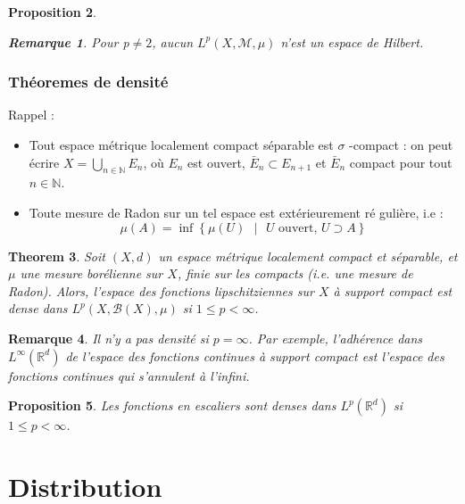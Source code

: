 \documentclass[3pt]{article}
\newtheorem{theorem}{Theorem}
\newtheorem{proposition}[theorem]{Proposition}
\newtheorem{remark}[theorem]{Remarque}
\begin{document}
\bigskip 

\begin{proposition}
\begin{remark}
Pour p$\neq 2$, aucun $L^{p}(X,\mathcal{M},\mu )$ n'est un espace de Hilbert.
\end{remark}
\end{proposition}

\bigskip 

\subsubsection{Th\'{e}oremes de densit\'{e}}

\bigskip 

Rappel : 

\begin{itemize}
\item Tout espace m\'{e}trique localement compact s\'{e}parable est $\sigma $%
-compact : on peut \'{e}crire $X=\bigcup_{n\in \mathbb{N}}E_{n}$, o\`{u} $%
E_{n}$ est ouvert, $\bar{E}_{n}\subset E_{n+1}$ et $\bar{E}_{n}$ compact
pour tout $n\in \mathbb{N}$.

\item Toute mesure de Radon sur un tel espace est ext\'{e}rieurement r\'{e}%
guli\`{e}re, i.e :%
\begin{equation*}
\mu (A)=\inf \left\{ \mu (U)\text{ }|\text{\ }U\text{\ ouvert, }U\supset
A\right\} 
\end{equation*}
\end{itemize}

\bigskip 

\begin{theorem}
Soit $(X,d)$ un espace m\'{e}trique localement compact et s\'{e}parable, et $%
\mu $ une mesure bor\'{e}lienne sur $X$, finie sur les compacts (i.e. une
mesure de Radon). Alors, l'espace des fonctions lipschitziennes sur $X$ \`{a}
support compact est dense dans $L^{p}(X,\mathcal{B}(X),\mu )$ si $1\leq
p<\infty $.
\end{theorem}

\bigskip 

\begin{remark}
Il n'y a pas densit\'{e} si $p=\infty $. Par exemple, l'adh\'{e}rence dans $%
L^{\infty }(\mathbb{R}^{d})$ de l'espace des fonctions continues \`{a}
support compact est l'espace des fonctions continues qui s'annulent \`{a}
l'infini.
\end{remark}

\bigskip 

\begin{proposition}
Les fonctions en escaliers sont denses dans $L^{p}(\mathbb{R}^{d})$ si $%
1\leq p<\infty $.
\end{proposition}

\section{Distribution}
\end{document}
